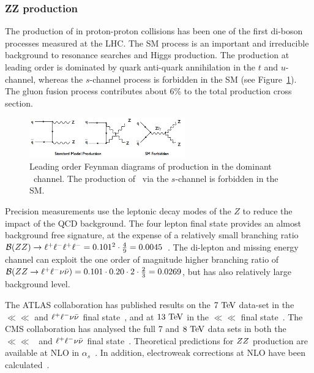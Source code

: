 \subsubsection{ZZ production}
\label{sss-ZZprod}

The production of \ZZ in proton-proton collisions has been one of the first di-boson 
processes measured at the LHC. The SM process is an important and irreducible
background to resonance searches and Higgs production. The production at leading
order is dominated by quark anti-quark annihilation in the $t$ and $u$-channel,
whereas the $s$-channel process is forbidden in the SM 
(see Figure~\ref{fig:sss-ZZprod-LOdiagrams}). The gluon fusion process 
contributes about 6\% to the total production cross section. 

\begin{figure}[htbp]
  \begin{center}
  \includegraphics[width=0.6\textwidth]{figures/sss-inclboson-diboson-zzprod-zzdiagram.png}
  \caption{Leading order Feynman diagrams of \ZZ production in the dominant 
  \qqbar\ channel. The production of \ZZ\ via the $s$-channel is forbidden in the SM.}
\label{fig:sss-ZZprod-LOdiagrams}
\end{center}
\end{figure}

Precision measurements use the leptonic decay modes of the $Z$ to reduce the impact of
the QCD background. 
The four lepton final state provides an almost background free signature, at the
expense of a relatively small branching ratio
$\mathcal{B}(ZZ) \to \ll\ll = 0.101^2 \cdot {4 \over 9} = 0.0045$~\cite{Agashe:2014kda}.  
The di-lepton and missing energy channel can exploit the one order of magnitude
higher branching ratio of 
$\mathcal{B}(\ZZ \to \ll\vv) = 0.101 \cdot 0.20 \cdot 2 \cdot {2 \over 3} = 0.0269$, 
but has also relatively large background level.

The ATLAS collaboration has published results on the $7\TeV$ data-set 
in the $\ll\ll$ and $\ll\vv$ final state~\cite{Aad:2012awa}, and at
$13\TeV$ in the $\ll\ll$ final state~\cite{Aad:2015zqe}. The CMS collaboration
has analysed the full 7 and $8\TeV$ data sets in both 
the $\ll\ll$~\cite{Chatrchyan:2012sga,CMS:2014xja} and 
$\ll\vv$ final state~\cite{Khachatryan:2015pba}.
Theoretical predictions for $\ZZ$ production are available 
at NLO in $\alpha_s$~\cite{Campbell:2011bn}. In addition, electroweak 
corrections at NLO have been calculated~\cite{Bierweiler:2013dja,Baglio:2013toa}. 


